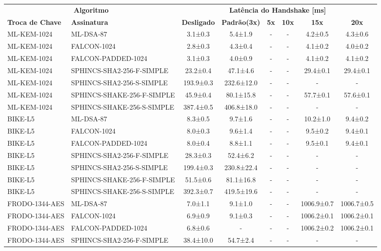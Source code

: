 \documentclass[10pt]{article}
\begin{document}
\centering
\small
\begin{tabular}{@{}l l c c c c c c@{}}
\toprule
\multicolumn{2}{c}{\textbf{Algoritmo}} & \multicolumn{6}{c}{\textbf{Latência do Handshake [ms]}} \\
\cmidrule(lr){1-2}\cmidrule(lr){3-8}
\textbf{Troca de Chave} & \textbf{Assinatura} & \textbf{Desligado} & \textbf{Padrão(3x)} & \textbf{5x} & \textbf{10x} & \textbf{15x} & \textbf{20x} \\
\midrule
ML-KEM-1024 & ML-DSA-87 & 3.1±0.3 & 5.4±1.9 & - & - & 4.2±0.5 & 4.3±0.6 \\
ML-KEM-1024 & FALCON-1024 & 2.8±0.3 & 4.3±0.4 & - & - & 4.1±0.2 & 4.0±0.2 \\
ML-KEM-1024 & FALCON-PADDED-1024 & 3.1±0.3 & 4.0±0.9 & - & - & 4.1±0.2 & 4.1±0.2 \\
ML-KEM-1024 & SPHINCS-SHA2-256-F-SIMPLE & 23.2±0.4 & 47.1±4.6 & - & - & 29.4±0.1 & 29.4±0.1 \\
ML-KEM-1024 & SPHINCS-SHA2-256-S-SIMPLE & 193.9±0.3 & 232.6±12.0 & - & - & - & - \\
ML-KEM-1024 & SPHINCS-SHAKE-256-F-SIMPLE & 45.9±0.4 & 80.1±15.8 & - & - & 57.7±0.1 & 57.6±0.1 \\
ML-KEM-1024 & SPHINCS-SHAKE-256-S-SIMPLE & 387.4±0.5 & 406.8±18.0 & - & - & - & - \\
BIKE-L5 & ML-DSA-87 & 8.3±0.5 & 9.7±1.6 & - & - & 10.2±1.0 & 9.4±0.2 \\
BIKE-L5 & FALCON-1024 & 8.0±0.3 & 9.6±1.4 & - & - & 9.5±0.2 & 9.4±0.1 \\
BIKE-L5 & FALCON-PADDED-1024 & 8.0±0.4 & 8.8±1.1 & - & - & 9.5±0.1 & 9.4±0.1 \\
BIKE-L5 & SPHINCS-SHA2-256-F-SIMPLE & 28.3±0.3 & 52.4±6.2 & - & - & - & - \\
BIKE-L5 & SPHINCS-SHA2-256-S-SIMPLE & 199.4±0.3 & 230.8±22.4 & - & - & - & - \\
BIKE-L5 & SPHINCS-SHAKE-256-F-SIMPLE & 51.5±0.6 & 81.1±16.8 & - & - & - & - \\
BIKE-L5 & SPHINCS-SHAKE-256-S-SIMPLE & 392.3±0.7 & 419.5±19.6 & - & - & - & - \\
FRODO-1344-AES & ML-DSA-87 & 7.0±1.1 & 9.1±1.0 & - & - & 1006.9±0.7 & 1006.7±0.5 \\
FRODO-1344-AES & FALCON-1024 & 6.9±0.9 & 9.1±0.3 & - & - & 1006.2±0.1 & 1006.2±0.1 \\
FRODO-1344-AES & FALCON-PADDED-1024 & 6.8±0.6 & - & - & - & 1006.2±0.2 & 1006.2±0.1 \\
FRODO-1344-AES & SPHINCS-SHA2-256-F-SIMPLE & 38.4±10.0 & 54.7±2.4 & - & - & - & - \\

\end{tabular}
\end{document}
